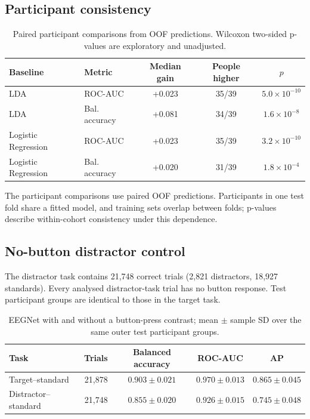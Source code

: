 \documentclass[11pt,a4paper]{article}
\begin{document}
\subsection{Participant consistency}
\begin{table}[htbp]\centering
\small\setlength{\tabcolsep}{4pt}
\caption{Paired participant comparisons from OOF predictions. Wilcoxon two-sided p-values are exploratory and unadjusted.}\label{tab:paired}
\begin{tabular}{llccc}
\toprule
Baseline & Metric & Median gain & People higher & $p$\\\midrule
LDA & ROC-AUC & +0.023 & 35/39 & $5.0\times10^{-10}$\\
LDA & Bal. accuracy & +0.081 & 34/39 & $1.6\times10^{-8}$\\
Logistic Regression & ROC-AUC & +0.023 & 35/39 & $3.2\times10^{-10}$\\
Logistic Regression & Bal. accuracy & +0.020 & 31/39 & $1.8\times10^{-4}$\\
\bottomrule
\end{tabular}\end{table}

The participant comparisons use paired OOF predictions. Participants in one test fold share a fitted model, and training sets overlap between folds; p-values describe within-cohort consistency under this dependence.

\subsection{No-button distractor control}
The distractor task contains 21,748 correct trials (2,821 distractors, 18,927 standards). Every analysed distractor-task trial has no button response. Test participant groups are identical to those in the target task.

\begin{table}[htbp]\centering
\small\setlength{\tabcolsep}{4pt}
\caption{EEGNet with and without a button-press contrast; mean $\pm$ sample SD over the same outer test participant groups.}\label{tab:gpucontrols}
\begin{tabular}{lrccc}
\toprule
Task & Trials & Balanced accuracy & ROC-AUC & AP\\\midrule
Target--standard & 21,878 & $0.903\pm0.021$ & $0.970\pm0.013$ & $0.865\pm0.045$\\
Distractor--standard & 21,748 & $0.855\pm0.020$ & $0.926\pm0.015$ & $0.745\pm0.048$\\
\bottomrule
\end{tabular}\end{table}
\end{document}
